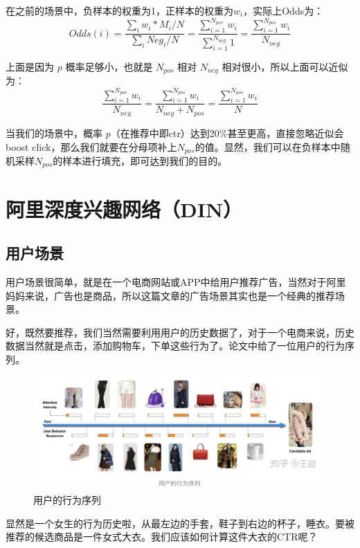\documentclass[12pt]{article}
\begin{document}
在之前的场景中，负样本的权重为1，正样本的权重为$w_i$，实际上Odds为：
$$
Odds(i) = \frac{\sum_iw_i * M_i/N}{\sum_i Neg_i/N} = \frac{\sum_{i=1}^{N_{pos}}w_i}{\sum_{i=1}^{N_{neg}}1} = \frac{\sum_{i=1}^{N_{pos}}w_i}{N_{neg}}
$$

上面是因为 $p$ 概率足够小，也就是 $N_{pos}$ 相对 $N_{neg}$ 相对很小，所以上面可以近似为：
$$
\frac{\sum_{i=1}^{N_{pos}}w_i}{N_{neg}} = \frac{\sum_{i=1}^{N_{pos}}w_i}{N_{neg} + N_{pos}} = \frac{\sum_{i=1}^{N_{pos}}w_i}{N}
$$

当我们的场景中，概率 $p$（在推荐中即ctr）达到20\%甚至更高，直接忽略近似会boost click，那么我们就要在分母项补上$N_{pos}$的值。显然，我们可以在负样本中随机采样$N_{pos}$的样本进行填充，即可达到我们的目的。

\section{阿里深度兴趣网络（DIN）}
\subsection{用户场景}
用户场景很简单，就是在一个电商网站或APP中给用户推荐广告，当然对于阿里妈妈来说，广告也是商品，所以这篇文章的广告场景其实也是一个经典的推荐场景。

好，既然要推荐，我们当然需要利用用户的历史数据了，对于一个电商来说，历史数据当然就是点击，添加购物车，下单这些行为了。论文中给了一位用户的行为序列。
\begin{figure}[H]
    \centering
    \includegraphics[width=1\textwidth]{fig/Ali_User_Behavior_Sequence.png}
    \caption{用户的行为序列}
\end{figure}

显然是一个女生的行为历史啦，从最左边的手套，鞋子到右边的杯子，睡衣。要被推荐的候选商品是一件女式大衣。我们应该如何计算这件大衣的CTR呢？
\end{document}
